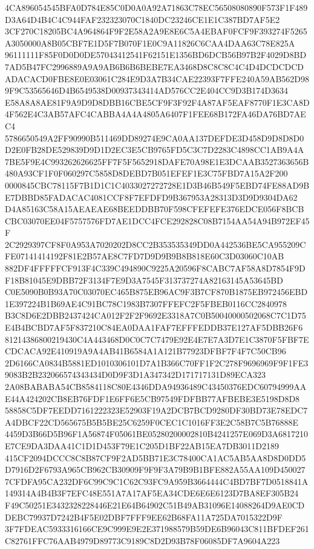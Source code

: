 \documentclass[UTF8,fontset=fandol,zihao=-4,a4paper]{ctexart}
\begin{document}
{{4CA896054545BFA0D784E85C0D0A0A92A71863C78EC56508080890F573F1F489D3A64D4B4C4C944FAF232323070C1840DC23246CE1E1C387BD7AF5E2
3CF270C18205BC4A964864F9F2E58A2A9E8E6C5A4EBAF0FCF9F393274F5265A3050000A8B05CBF7E1D5F7B070F1E0C9A11826C6CAA4DAA63C78E825A
96111111F85F0D0D0DE57043412541F62151E1356BD6DCB56B97B2F4029D8BD7AD5B47FC2996889A9A9AB6B6B6BEBE7EA3468D8C8C8C4C4D4DCDCDCD
ADACACD0FBE8E0E03061C284E9D3A7B34CAE22393F7FFE240A59AB562D989F9C53565646D4B6549538D00937343414AD576CC2E404CC9D3B174D3634
E58A8A8AE81F9A9D9D8DBB16CBE5CF9F3F92F4A87AF5EAF8770F1E3CA8D4F562E4C3AB57AFC4CABBA4A4A4805A6407F1FEE68B172FA46DA76BD7AEC4
5786650549A2FF90990B511469DD89274E9CA0AA137DEFDE3D458D9D8D8D0D2E0FB28DE529839D9D1D2EC3E5CB9765FD5C3C7D2283C4898CC1AB9A4A
7BE5F9E4C993262626625FF7F5F5652918DAFE70A98E1E3DCAAB3527363656B480A93CF1F0F060297C5858D8DEBD7B051EFEF1E3C75FBD7A15A2F200
0000845CBC78115F7B1D1C1C4033027272728E1D3B46B549F5EBD74FE88AD9BE7DBBD85FADACAC4081CCF8F7EFDFD9B367953A28313D3D9D9304DA62
D4A85163C58A15AEAEAE68BEEDDBB70F598CFEFEFE376EDCE056F8BCBCBC03070EE04F5757576FD7AE1DCC4FCE292828C08B7154AA54A94B972EF45F
2C2929397CF8F0A953A7020202D8CC2B353535349DD0A442536BE5CA955209CFE07141414192F81E2B57AE8C7FD7D9D9B9B8B818E60C3D03060C10AB
882DF4FFFFFCF913F4C339C494890C9225A20596F8CABC7AF58A8D7854F9DF18B81045E9DBB72F3134F7E9D3A7545F313737274A82163145A53645BD
C0E5090B0B93A70C03070EC465B875EB96AC9F3B7CF870B1875EB972456EBD1E397224B1B69AE4C91BC78C1983B7307FFEFC2F5FBEB0116CC2840978
B3C8D6E2DBB2437424CA012F2F2F9692E3318A7C0B50040000502068C7C1D75E4B4BCBD7AF5F837210C84EA0DAA1FAF7EFFFEDDB37E127AF5DBB26F6
81214386800219430C4A443468D0C0C7C7479E92E4E7E7A3D7E1C3870F5FBF7ECDCACA92E410919A9A4AB41B6584A1A121B77923DFBF7F4F7C50CB96
2D6166CA0834B5881ED1010306101D7A1B366C70FF1F2C278F9696969F9F1FE39083B2B232066574343434D0D9F3D1A347342D171717131D89ECA323
2A08BABABA54CB8584118C80E4346DDA94936489C43450376EDC60794999AAE44A424202CB8EB76FDF1E6FF6E5CB97549FDFBB77AFBEBE3E5198D8D8
58858C5DF7EEDD7161222323E52903F19A2DCB7BCD9280DF30BD73E78EDC7A4DBCF22CD565675B5B5BE25C6259F0CEC1C1016FF3E2C58B7C5B76888E
4459D3B66D5B96F1A56874F05061BE05280200002810B4241257E069D3A6817210E7CE9DA3DAA41C1D1D453F79E1C205D1BF22AB15EA7DB3011D2189
415CF2094DCCC8C8B87CF9F2AD5BB71E3C78400CA1AC5AB5AA8D8D0DD5D7916D2F6793A965CB962CB30909F9F9F3A79B9B1BFE882A55AA109D450027
7CFDFA95CA232DF6C99C9C1C62C93FC9A959B3664444C4BD7BF7D0518841A149314A4B4B3F7EFC48E551A7A17AF5EA34CDE6E6E6123D7BA8EF305B24
F49C50251E3432328228446E21E64B64902C51B49AB31096E14088264D9AE0CDDEBC79937D7242B4F5E02DBF7FFF9EE62B68FA11A725DA7015322D9F
3F7FDEAC5933316166CE9C999E9E2E371988579B59DE6B96043C811BFDEF261C82761FFC76AAB4979D89773C9189C8D2D93B78F06085DF7A9604A223
}}
\end{document}
